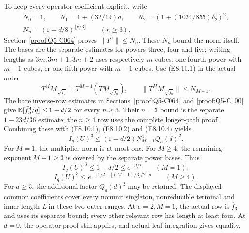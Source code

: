 To keep every operator coefficient explicit, write
\[
\begin{gathered}
N_0=1,\qquad N_1=1+(32/19)d,\qquad
N_2=(1+(1024/855)\delta_2)^2,\\
N_n=(1-d/8)^{\lfloor n/3\rfloor}\qquad(n\ge3).
\end{gathered}
\]
Section~\ref{proof:Q5-C064} proves \(\lVert T^n\rVert\le N_n\).
These \(N_n\) bound the norm itself. The bases are the separate estimates
for powers three, four and five; writing lengths as \(3m,\allowbreak 3m+1,\allowbreak 3m+2\)
uses respectively \(m\) cubes, one fourth power with \(m-1\) cubes, or
one fifth power with \(m-1\) cubes.  Use (E8.10.1) in the actual order
\[
T^MM_{\sqrt{\bar f_a}}
=T^{M-1}(TM_{\sqrt{\bar f_a}}),\qquad
\lVert T^MM_{\sqrt{\bar f_a}}\rVert\le N_{M-1}.
\]
The bare inverse-row estimates in Sections~\ref{proof:Q5-C064}
and \ref{proof:Q5-C100} give
\(\mathbb E[\bar f_n^4/q]\le1-d/2\) for every \(n\ge3\).
Their \(n=3\) bound is the separate \(1-23d/36\) estimate; the
\(n\ge4\) row uses the complete longer-path proof. Combining these
with (E8.10.1), (E8.10.2) and (E8.10.4) yields
\[
\boxed{I_q(U)^3\le(1-d/2)N_{M-1}^4Q_a(d)^2.}
\tag{E8.10.5}
\]
For \(M=1\), the multiplier norm is at most one. For \(M\ge4\), the
remaining exponent \(M-1\ge3\) is covered by the separate power bases.
Thus
\[
I_q(U)^3\le1-d/2\le e^{-d/2}\qquad(M=1),
\tag{E8.10.6}
\]
\[
I_q(U)^3\le
e^{-[1/2+\lfloor(M-1)/3\rfloor/2]d}\qquad(M\ge4).
\tag{E8.10.7}
\]
For \(a\ge3\), the additional factor \(Q_a(d)^2\) may be retained.
The displayed common coefficients cover every nonunit singleton,
nonreducible terminal and inner length \(L\) in these two outer ranges.
At \(a=2,\allowbreak M=1\), the actual row is \(\bar f_3\) and uses its separate
bound; every other relevant row has length at least four.
At \(d=0\), the operator proof still applies, and actual leaf integration
gives equality.
